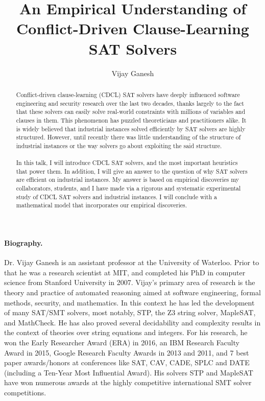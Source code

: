\documentclass[EPiCempty]{easychair}
\begin{document}
\title{An Empirical Understanding of Conflict-Driven Clause-Learning SAT Solvers}
\author{Vijay Ganesh}


\maketitle
\begin{abstract}
Conflict-driven clause-learning (CDCL) SAT solvers have deeply influenced
software engineering and security research over the last two decades, thanks
largely to the fact that these solvers can easily solve real-world constraints
with millions of variables and clauses in them. This phenomenon has puzzled
theoreticians and practitioners alike. It is widely believed that industrial
instances solved efficiently by SAT solvers are highly structured. However,
until recently there was little understanding of the structure of industrial
instances or the way solvers go about exploiting the said structure.
\\\\
In this talk, I will introduce CDCL SAT solvers, and the most important
heuristics that power them. In addition, I will give an answer to the question
of why SAT solvers are efficient on industrial instances. My answer is based on
empirical discoveries my collaborators, students, and I have made via a
rigorous and systematic experimental study of CDCL SAT solvers and industrial
instances. I will conclude with a mathematical model that incorporates our
empirical discoveries.
\end{abstract}

\paragraph{Biography.} Dr. Vijay Ganesh is an assistant professor at the
University of Waterloo. Prior to that he was a research scientist at MIT, and
completed his PhD in computer science from Stanford University in 2007.
%
Vijay's primary area of research is the theory and practice of automated
reasoning aimed at software engineering, formal methods, security, and
mathematics. In this context he has led the development of many SAT/SMT
solvers, most notably, STP, the Z3 string solver, MapleSAT, and MathCheck. He
has also proved several decidability and complexity results in the context of
theories over string equations and integers. For his research, he won the Early
Researcher Award (ERA) in 2016, an IBM Research Faculty Award in 2015, Google
Research Faculty Awards in 2013 and 2011, and 7 best paper awards/honors at
conferences like SAT, CAV, CADE, SPLC and DATE (including a Ten-Year Most
Influential Award). His solvers STP and MapleSAT have won numerous awards at
the highly competitive international SMT solver competitions. 
\end{document}
